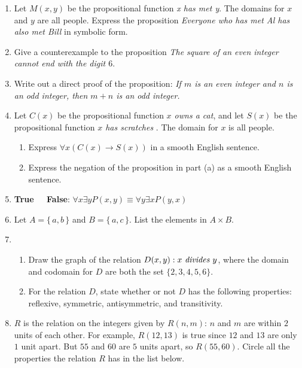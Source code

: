 \begin{enumerate}

\item Let $M(x,y)$ be the propositional function {\it x has met y}.
The domains for $x$ and $y$ are all people.
Express the proposition {\it Everyone who has met Al has also
met Bill} in symbolic form.
\medskip 

\item Give a counterexample to the proposition {\it The square of an
even integer cannot end with the digit $6$}.
\medskip 
\item  Write out a direct proof of the proposition: {\it If $m$ is an even integer and $n$ is an
odd integer, then $m+n$ is an odd integer.}

\medskip 
\item Let $C(x)$ be the propositional function {\it $x$ owns a cat}, and let
$S(x)$ be the propositional function {\it $x$ has scratches }. The domain for $x$ is all
people.
\begin{enumerate}
\item Express $\forall{x}(C(x)\rightarrow S(x))$ in a smooth English sentence.

\item Express the negation of the proposition in part (a) as a smooth English sentence.
\end{enumerate}

\medskip 
\item {\bf True \ \  False}: $\forall{x}\exists{y} P(x,y) \equiv \forall{y}\exists{x}P(y,x)$ 
\medskip 
\item Let $A=\{\, a,b\,\}$ and $B=\{\,a,c\,\}$. List the elements in $A \times B$.
\medskip 
\item 
\begin{enumerate}
\item Draw the graph of the relation $D(x,y): x \text{ \it divides } y$, where
the domain and codomain for $D$ are both the set $\{2,3,4,5,6\}$.

\item For the relation $D$, state whether or not $D$ has the 
following properties: reflexive, symmetric, antisymmetric, and transitivity.
\end{enumerate}
 \medskip 
 
\item $R$ is the relation on the integers given by $R(n,m)$: $n$ and $m$ are within $2$ units of each other.
 For example,
$R(12,13)$ is true since $12$ and $13$ are only $1$ unit apart. But $55$ and $60$ are $5$ units apart,
so $R(55,60)$. Circle all the  properties the 
relation $R$ has in the list below.


\end{enumerate}
